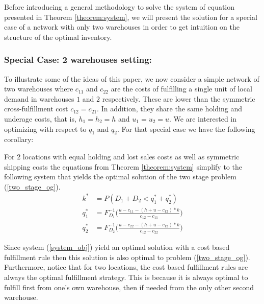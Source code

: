 \documentclass[poms,final,blindrev]{poms1_V1} %
\begin{document}
Before introducing a general methodology to solve the system of equation presented in Theorem \ref{theorem:system}, we will present the solution for a special case of a network with only two warehouses in order to get intuition on the structure of the optimal inventory.


\subsubsection{Special Case: 2 warehouses setting:}

To illustrate some of the ideas of this paper, we now consider a simple network of two warehouses where $c_{11}$ and $c_{22}$ are the costs of fulfilling a single unit of local demand in warehouses $1$ and $2$ respectively. These are lower than the symmetric cross-fulfillment cost $c_{12}= c_{21}$. In addition, they share the same holding and underage costs, that is, $h_1 = h_2 = h$ and $u_1 = u_2 = u$. We are interested in optimizing with respect to $q_1$ and $q_2$. 
For that special case we have the following corollary:

\begin{corollary}\label{cor:2_loc} For 2 locations with equal holding and lost sales costs as well as symmetric shipping costs the equations from Theorem \ref{theorem:system} simplify to the following system that yields the optimal solution of the two stage problem (\ref{two_stage_og}).
\begin{equation}
\begin{aligned}
\label{2_warehouses}
k^* &= P(D_1 + D_2 < q^*_1 + q^*_2) \\
q^*_1 &=  F_{D_1}^{-1} \Big( \frac{u - c_{11} - (h + u - c_{12})  * k  }{  c_{12} - c_{11} } \Big)\\
q^*_2 &= F_{D_2}^{-1} \Big( \frac{u - c_{22} - (h + u - c_{12}) * k  }{ c_{12} - c_{22} }\Big)
\end{aligned}
\end{equation}
\end{corollary}
 Since system (\ref{system_obj}) yield an optimal solution with a cost based fulfillment rule then this solution is also optimal to problem (\ref{two_stage_og}). \Halmos \endproof
Furthermore, notice that for two locations, the cost based fulfillment rules are always the optimal fulfillment strategy. This is because it is always optimal to fulfill first from one's own warehouse, then if needed from the only other second warehouse.
\end{document}
